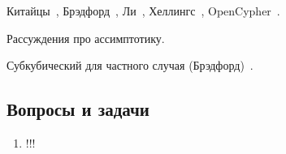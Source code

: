 Китайцы~\cite{!!!}, Брэдфорд~\cite{!!!}, Ли~\cite{Lee:2002:FCG:505241.505242}, Хеллингс~\cite{!!!}, OpenCypher~\cite{Kuijpers:2019:ESC:3335783.3335791}.

Рассуждения про ассимптотику.

Субкубический для частного случая (Брэдфорд)~\cite{8249039}.

\subsection{Вопросы и задачи}
\begin{enumerate}
  \item !!!
\end{enumerate}
